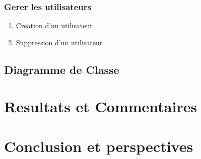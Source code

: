 \documentclass[11pt,a4paper]{report}
\begin{document}
 \subsection{Gerer les utilisateurs}
 \begin{enumerate}
 \item Creation d'un utilisateur
 \item Suppression d'un utilisateur
 \end{enumerate}
 \section{Diagramme de Classe}
\chapter{Resultats et Commentaires}
\chapter*{Conclusion et perspectives}
\end{document}
